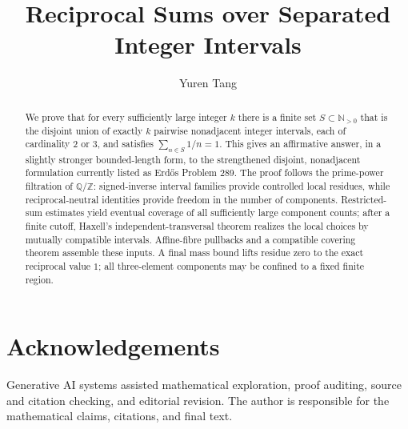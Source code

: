 \documentclass[11pt,a4paper,reqno]{amsart}
\title[Reciprocal Sums over Separated Intervals]{Reciprocal Sums over Separated Integer Intervals}
\author{Yuren Tang}
\date{}
\theoremstyle{definition}
\theoremstyle{remark}
\newcommand{\N}{\mathbb N}
\newcommand{\Q}{\mathbb Q}
\newcommand{\Z}{\mathbb Z}
\numberwithin{equation}{section}
\begin{document}
\begin{abstract}
We prove that for every sufficiently large integer $k$ there is a finite set $S\subset\N_{>0}$ that is the disjoint union of exactly $k$ pairwise nonadjacent integer intervals, each of cardinality $2$ or $3$, and satisfies $\sum_{n\in S}1/n=1$.  This gives an affirmative answer, in a slightly stronger bounded-length form, to the strengthened disjoint, nonadjacent formulation currently listed as Erd\H{o}s Problem 289.  The proof follows the prime-power filtration of $\Q/\Z$: signed-inverse interval families provide controlled local residues, while reciprocal-neutral identities provide freedom in the number of components.  Restricted-sum estimates yield eventual coverage of all sufficiently large component counts; after a finite cutoff, Haxell's independent-transversal theorem realizes the local choices by mutually compatible intervals.  Affine-fibre pullbacks and a compatible covering theorem assemble these inputs.  A final mass bound lifts residue zero to the exact reciprocal value $1$; all three-element components may be confined to a fixed finite region.
\end{abstract}

\maketitle











\appendix




\section*{Acknowledgements}
Generative AI systems assisted mathematical exploration, proof auditing, source and citation checking, and editorial revision. The author is responsible for the mathematical claims, citations, and final text.

\clearpage
\printbibliography
\end{document}
